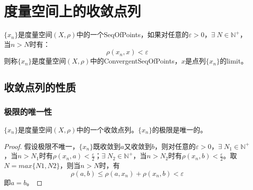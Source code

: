 \section{度量空间上的收敛点列}
\begin{definition}\label{def:convergence of range of points}
	$\{x_n\}$是度量空间$(X,\rho)$中的一个\gls{SeqOfPoints}，如果对任意的$\varepsilon>0$，$\exists\; N\in\mathbb{N}^+$，当$n>N$时有：
	\begin{equation*}
		\rho(x_n,x)<\varepsilon
	\end{equation*}
	则称$\{x_n\}$是度量空间$(X,\rho)$中的\gls{ConvergentSeqOfPoints}，$x$是点列$\{x_n\}$的\gls{limit}。
\end{definition}
\subsection*{收敛点列的性质}
\subsubsection{极限的唯一性}
\begin{theorem}
	$\{x_n\}$是度量空间$(X,\rho)$中的一个收敛点列。$\{x_n\}$的极限是唯一的。
\end{theorem}
\begin{proof}
	假设极限不唯一，$\{x_n\}$既收敛到$a$又收敛到$b$，则对任意的$\varepsilon>0$，$\exists\; N_1\in\mathbb{N}^+$，当$n>N_1$时有$\rho(x_n,a)<\frac{\varepsilon}{2}$；$\exists\; N_2\in\mathbb{N}^+$，当$n>N_2$时有$\rho(x_n,b)<\frac{\varepsilon}{2}$。取$N=max\{N1,N2\}$，则当$n>N$时，有
	\begin{equation*}
		\rho(a,b)\leqslant\rho(a,x_n)+\rho(x_n,b)<\varepsilon
	\end{equation*}
	即$a=b$。
\end{proof}
